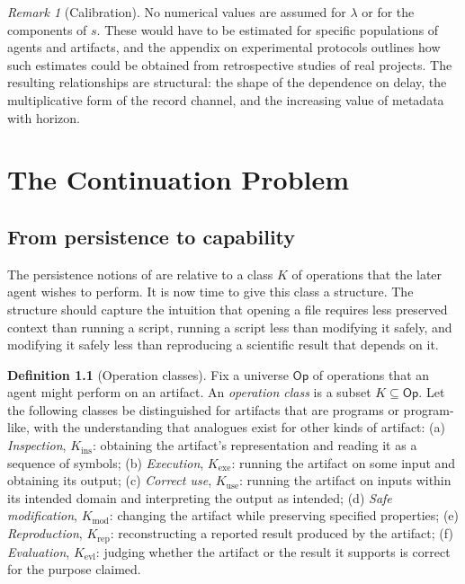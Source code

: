 \documentclass[11pt,twoside,openright]{book}
\theoremstyle{plain}
\theoremstyle{definition}
\newtheorem{definition}[theorem]{Definition}
\theoremstyle{remark}
\newtheorem{remark}[theorem]{Remark}
\begin{document}
\begin{remark}[Calibration]
No numerical values are assumed for $\lambda$ or for the components of $s$. These would have to be estimated for specific populations of agents and artifacts, and the appendix on experimental protocols outlines how such estimates could be obtained from retrospective studies of real projects. The resulting relationships are structural: the shape of the dependence on delay, the multiplicative form of the record channel, and the increasing value of metadata with horizon.
\end{remark}

\chapter{The Continuation Problem}\label{ch:continuation}

\section{From persistence to capability}

The persistence notions of  are relative to a class $K$ of operations that the later agent wishes to perform. It is now time to give this class a structure. The structure should capture the intuition that opening a file requires less preserved context than running a script, running a script less than modifying it safely, and modifying it safely less than reproducing a scientific result that depends on it.

\begin{definition}[Operation classes]\label{def:opclasses}
Fix a universe $\mathsf{Op}$ of operations that an agent might perform on an artifact. An \emph{operation class} is a subset $K\subseteq\mathsf{Op}$. Let the following classes be distinguished for artifacts that are programs or program-like, with the understanding that analogues exist for other kinds of artifact:
(a) \emph{Inspection}, $K_{\mathrm{ins}}$: obtaining the artifact's representation and reading it as a sequence of symbols; (b) \emph{Execution}, $K_{\mathrm{exe}}$: running the artifact on some input and obtaining its output; (c) \emph{Correct use}, $K_{\mathrm{use}}$: running the artifact on inputs within its intended domain and interpreting the output as intended; (d) \emph{Safe modification}, $K_{\mathrm{mod}}$: changing the artifact while preserving specified properties; (e) \emph{Reproduction}, $K_{\mathrm{rep}}$: reconstructing a reported result produced by the artifact; (f) \emph{Evaluation}, $K_{\mathrm{evl}}$: judging whether the artifact or the result it supports is correct for the purpose claimed.
\end{definition}
\end{document}
